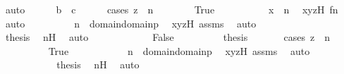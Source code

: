 \begin{isabellebody}
\ auto\isanewline
\isanewline
\ \ \ \ \isamarkupfalse%
\ {\isachardoublequoteopen}b\ {\isacharequal}{\kern0pt}\ c{\isachardoublequoteclose}\ \isanewline
\ \ \ \ \isamarkupfalse%
{\isacharparenleft}{\kern0pt}cases\ {\isachardoublequoteopen}z\ {\isacharequal}{\kern0pt}\ n{\isachardoublequoteclose}{\isacharparenright}{\kern0pt}\isanewline
\ \ \ \ \ \ \isamarkupfalse%
\ True\ \isanewline
\ \ \ \ \ \ \isamarkupfalse%
\ \isamarkupfalse%
\ {\isachardoublequoteopen}x\ {\isacharequal}{\kern0pt}\ n{\isacharprime}{\kern0pt}{\isachardoublequoteclose}\ \isamarkupfalse%
\ xyzH\ fn\ \isamarkupfalse%
\ auto\isanewline
\ \ \ \ \ \ \isamarkupfalse%
\ \isamarkupfalse%
\ {\isachardoublequoteopen}n{\isacharprime}{\kern0pt}\ {\isasymin}\ domain{\isacharparenleft}{\kern0pt}domain{\isacharparenleft}{\kern0pt}p{\isacharparenright}{\kern0pt}{\isacharparenright}{\kern0pt}{\isachardoublequoteclose}\ \isamarkupfalse%
\ xyzH\ assms{}\ \isamarkupfalse%
\ auto\ \ \ \ \ \isanewline
\ \ \ \ \ \ \isamarkupfalse%
\ \isamarkupfalse%
\ {\isacharquery}{\kern0pt}thesis\ \isamarkupfalse%
\ n{\isacharprime}{\kern0pt}H\ \isamarkupfalse%
\ auto\isanewline
\ \ \ \ \isamarkupfalse%
\isanewline
\ \ \ \ \ \ \isamarkupfalse%
\ False\isanewline
\ \ \ \ \ \ \isamarkupfalse%
\ \isamarkupfalse%
\ {\isacharquery}{\kern0pt}thesis\isanewline
\ \ \ \ \ \ \isamarkupfalse%
{\isacharparenleft}{\kern0pt}cases\ {\isachardoublequoteopen}z\ {\isacharequal}{\kern0pt}\ n{\isacharprime}{\kern0pt}{\isachardoublequoteclose}{\isacharparenright}{\kern0pt}\isanewline
\ \ \ \ \ \ \ \ \isamarkupfalse%
\ True\isanewline
\ \ \ \ \ \ \ \ \isamarkupfalse%
\ \isamarkupfalse%
\ {\isachardoublequoteopen}n{\isacharprime}{\kern0pt}\ {\isasymin}\ domain{\isacharparenleft}{\kern0pt}domain{\isacharparenleft}{\kern0pt}p{\isacharparenright}{\kern0pt}{\isacharparenright}{\kern0pt}{\isachardoublequoteclose}\ \isamarkupfalse%
\ xyzH\ assms{}\ \isamarkupfalse%
\ auto\ \ \ \ \ \isanewline
\ \ \ \ \ \ \ \ \isamarkupfalse%
\ \isamarkupfalse%
\ {\isacharquery}{\kern0pt}thesis\ \isamarkupfalse%
\ n{\isacharprime}{\kern0pt}H\ \isamarkupfalse%
\ auto\isanewline

\end{isabellebody}
